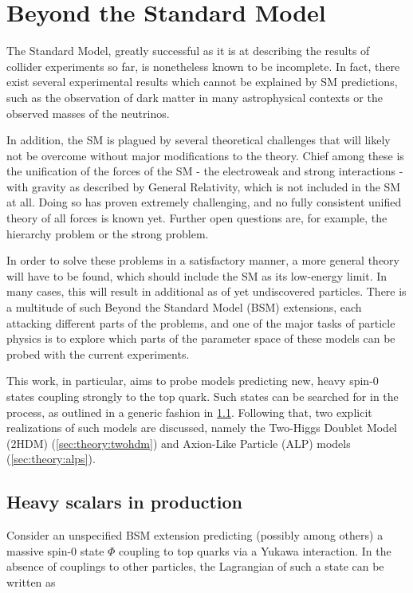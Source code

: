\section{Beyond the Standard Model}
\label{sec:theory:bsm}

The Standard Model, greatly successful as it is at describing the results of collider experiments so far, is nonetheless known to be incomplete. In fact, there exist several experimental results which cannot be explained by SM predictions, such as the observation of dark matter in many astrophysical contexts or the observed masses of the neutrinos. 

In addition, the SM is plagued by several theoretical challenges that will likely not be overcome without major modifications to the theory. Chief among these is the unification of the forces of the SM - the electroweak and strong interactions - with gravity as described by General Relativity, which is not included in the SM at all. Doing so has proven extremely challenging, and no fully consistent unified theory of all forces is known yet. Further open questions are, for example, the hierarchy problem or the strong \CP problem.

In order to solve these problems in a satisfactory manner, a more general theory will have to be found, which should include the SM as its low-energy limit. In many cases, this will result in additional as of yet undiscovered particles. There is a multitude of such Beyond the Standard Model (BSM) extensions, each attacking different parts of the problems, and one of the major tasks of particle physics is to explore which parts of the parameter space of these models can be probed with the current experiments.

This work, in particular, aims to probe models predicting new, heavy spin-0 states coupling strongly to the top quark. Such states can be searched for in the \pptt process, as outlined in a generic fashion in \cref{sec:theory:ah}. Following that, two explicit realizations of such models are discussed, namely the Two-Higgs Doublet Model (2HDM) (\cref{sec:theory:twohdm}) and Axion-Like Particle (ALP) models (\cref{sec:theory:alps}).

\subsection{Heavy scalars in \ttbartitle production}
\label{sec:theory:ah}

Consider an unspecified BSM extension predicting (possibly among others) a massive spin-0 state $\Phi$ coupling to top quarks via a Yukawa interaction. In the absence of couplings to other particles, the Lagrangian of such a state can be written as~\cite{Maltoni:2024tul}

